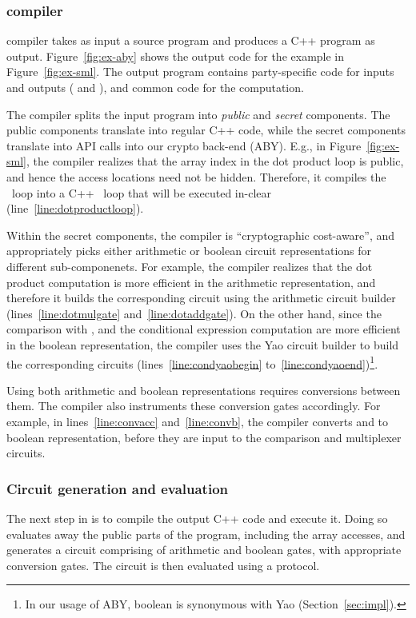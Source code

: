 \subsubsection*{\tool compiler}
\tool compiler takes as input a source program and produces a C++
program as output. Figure~\ref{fig:ex-aby} shows the output code for
the example in Figure~\ref{fig:ex-sml}. The output program
contains party-specific code for inputs and outputs
( and ), and common code for the
computation.

The compiler splits the input
program into \emph{public} and \emph{secret} components. The public
components translate into regular C++ code, while the secret
components translate into API calls into our crypto back-end
(ABY). E.g., in Figure~\ref{fig:ex-sml}, the \tool
compiler realizes that the array index  in the dot product loop
is public, and hence the access locations need not be hidden.
Therefore, it compiles the ~loop into a C++
~loop that will be executed in-clear
(line~\ref{line:dotproductloop}).

Within the secret components, the \tool compiler is ``cryptographic
cost-aware'', and appropriately picks either arithmetic or boolean
circuit representations for different sub-componenets. For example,
the compiler realizes that the dot product computation is more
efficient in the arithmetic representation, and therefore it builds
the corresponding circuit using the arithmetic circuit builder
 (lines~\ref{line:dotmulgate} and~\ref{line:dotaddgate}). On
the other hand, since the comparison with , and the conditional
expression computation are more efficient in the boolean
representation, the \tool compiler uses the Yao circuit builder
 to build the corresponding circuits
(lines~\ref{line:condyaobegin} to~\ref{line:condyaoend})\footnote{In our usage of ABY, boolean is synonymous
  with Yao (Section~\ref{sec:impl}).}.

Using both arithmetic and boolean representations requires conversions between them.
The \tool compiler also
instruments these conversion gates accordingly. For example, in
lines~\ref{line:convacc} and~\ref{line:convb}, the compiler converts
 and  to boolean representation, before they are
input to the comparison and multiplexer circuits.

\subsubsection*{Circuit generation and evaluation} The next step in
\tool is to
compile the output C++ code and execute it. Doing so evaluates away the
public parts of the program, including the array accesses, and
generates a \mpc circuit comprising of arithmetic and boolean gates,
with appropriate conversion gates. The circuit is then evaluated using
a \mpc protocol.

